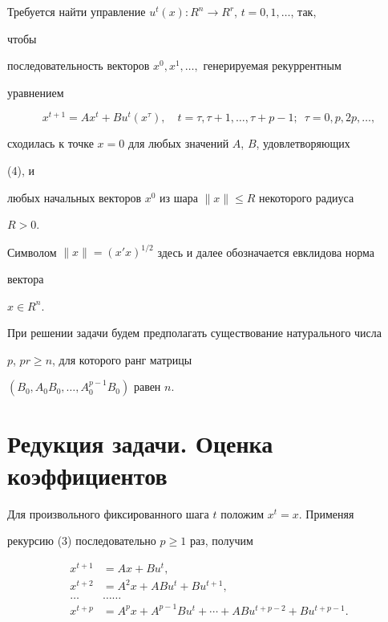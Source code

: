  


Требуется найти управление $u^t(x):R^n\to R^r$, $t=0,1,\dotsc$, так, 


чтобы 


последовательность векторов $x^0,x^1,\dotsc,$ генерируемая рекуррентным 


уравнением 


\begin{equation} 


x^{t+1}=A x^t+B u^t(x^\tau),\quad t=\tau,\tau+1,\dotsc,\tau+p-1;


\ \; \tau=0,p,2p,\dotsc, 


\end{equation} 


сходилась к точке $x=0$ для любых значений $A$, $B$, удовлетворяющих 


(4), и 


любых начальных векторов $x^0$ из шара $\|x\|\le R$ некоторого радиуса 


$R>0$. 


Символом $\|x\|=(x'x)^{1/2}$ здесь и далее обозначается евклидова норма 


вектора 


$x\in R^n$. 


 


При решении задачи будем предполагать существование натурального числа 


$p$, $pr\ge n$, для которого ранг матрицы 


$(B_0,A_0B_0,\dotsc,A^{p-1}_0B_0)$ равен $n$. 


 


\section{Редукция задачи. Оценка коэффициентов} 


 


Для произвольного фиксированного шага $t$ положим $x^t=x$. Применяя 


рекурсию (3) последовательно $p\ge 1$ раз, получим 


\begin{align*} 


x^{t+1}&=Ax+Bu^t,\\ 


x^{t+2}&=A^2x+ABu^t+Bu^{t+1},\\ 


\dotsc&\dotsc\dotsc \\ 


x^{t+p}&=A^p x+A^{p-1}Bu^t+\dotsb+ABu^{t+p-2}+Bu^{t+p-1}. 


\end{align*} 



